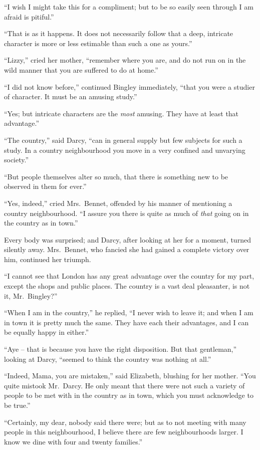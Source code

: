 “I wish I might take this for a compliment; but to
be so easily seen through I am afraid is pitiful.”

“That is as it happens. It does not necessarily follow
that a deep, intricate character is more or less estimable
than such a one as yours.”

“Lizzy,” cried her mother, “remember where you are,
and do not run on in the wild manner that you are suffered
to do at home.”

“I did not know before,” continued Bingley immediately,
“that you were a studier of character. It must be
an amusing study.”

“Yes; but intricate characters are the \textit{most} amusing.
They have at least that advantage.”

“The country,” said Darcy, “can in general supply but
few subjects for such a study. In a country
neighbourhood you move in a very confined and unvarying
society.”

“But people themselves alter so much, that there is
something new to be observed in them for ever.”

“Yes, indeed,” cried Mrs.\ Bennet, offended by his
manner of mentioning a country neighbourhood. “I
assure you there is quite as much of \textit{that} going on in the
country as in town.”

Every body was surprised; and Darcy, after looking
at her for a moment, turned silently away. Mrs.\ Bennet,
who fancied she had gained a complete victory over him,
continued her triumph.

“I cannot see that London has any great advantage
over the country for my part, except the shops and public
places. The country is a vast deal pleasanter, is not it,
Mr.\ Bingley?”

“When I am in the country,” he replied, “I never
wish to leave it; and when I am in town it is pretty much
the same. They have each their advantages, and I can
be equally happy in either.”

“Aye -- that is because you have the right disposition.
But that gentleman,” looking at Darcy, “seemed to think
the country was nothing at all.”

“Indeed, Mama, you are mistaken,” said Elizabeth,
blushing for her mother. “You quite mistook Mr.\ Darcy.
He only meant that there were not such a variety of people
to be met with in the country as in town, which you must
acknowledge to be true.”

“Certainly, my dear, nobody said there were; but as
to not meeting with many people in this neighbourhood,
I believe there are few neighbourhoods larger. I know
we dine with four and twenty families.”

